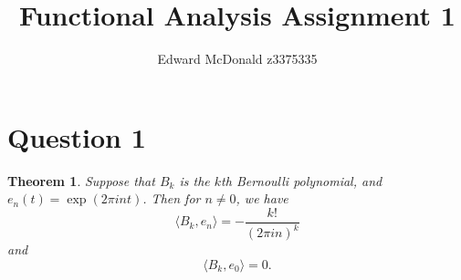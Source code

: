 \documentclass[10pt]{article}
\title{Functional Analysis Assignment 1}
\author{Edward McDonald z3375335}
\date{}
\newtheorem{theorem}{Theorem}
\begin{document}
    \maketitle{}
    \section*{Question 1}
    \begin{theorem}
        Suppose that $B_k$ is the $k$th Bernoulli polynomial,
        and $e_n(t) = \exp(2\pi i n t)$. Then for $n \neq 0$, we have
        \begin{equation*}
            \langle B_k,e_n\rangle = -\frac{k!}{(2\pi i n)^k}
        \end{equation*}
        and
        \begin{equation*}
            \langle B_k,e_0\rangle = 0.
        \end{equation*}
    \end{theorem}
\end{document}
